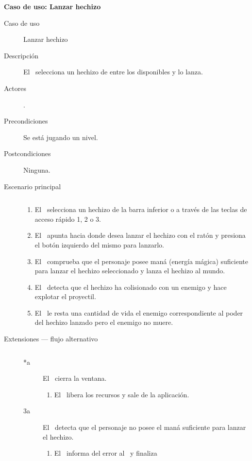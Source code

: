 \textbf{Caso de uso: Lanzar hechizo}

\begin{description}
    \item [Caso de uso] Lanzar hechizo
    \item [Descripción] El \jugador\ selecciona un hechizo de entre los
    disponibles y lo lanza.
    \item [Actores] \jugador.
    \item [Precondiciones] Se está jugando un nivel.
    \item [Postcondiciones] Ninguna.
    \item [Escenario principal] $\quad$
        \begin{enumerate}
            \item El \jugador\ selecciona un hechizo de la barra inferior
            o a través de las teclas de acceso rápido 1, 2 o 3.
            \item El \jugador\ apunta hacia donde desea lanzar el hechizo
            con el ratón y presiona el botón izquierdo del mismo para
            lanzarlo.
            \item El \sistema\ comprueba que el personaje posee maná (energía
            mágica) suficiente para lanzar el hechizo seleccionado y lanza
            el hechizo al mundo.
            \item El \sistema\ detecta que el hechizo ha colisionado con
            un enemigo y hace explotar el proyectil.
            \item El \sistema\ le resta una cantidad de vida el enemigo
            correspondiente al poder del hechizo lanzado pero el enemigo
            no muere.
        \end{enumerate}
    \item[Extensiones --- flujo alternativo] $\quad$
        \begin{description}
            \item [*a] El \jugador\ cierra la ventana.
                \begin{enumerate}
                    \item El \sistema\ libera los recursos y sale de la aplicación.
                \end{enumerate}
            \item [3a] El \sistema\ detecta que el personaje no posee el maná
            suficiente para lanzar el hechizo.
                \begin{enumerate}
                    \item El \sistema\ informa del error al \jugador\ y finaliza

\end{enumerate}
\end{description}
\end{description}
